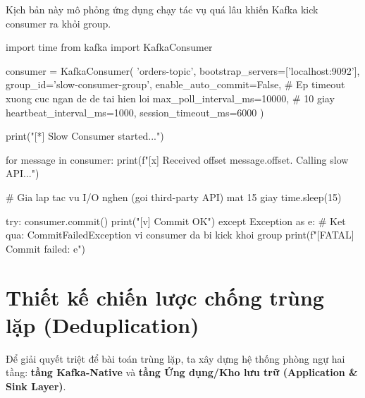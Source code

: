 \documentclass[12pt]{article}
\begin{document}
Kịch bản này mô phỏng ứng dụng chạy tác vụ quá lâu khiến Kafka kick consumer ra khỏi group.

\begin{aivnpybox}
import time
from kafka import KafkaConsumer

consumer = KafkaConsumer(
    'orders-topic',
    bootstrap_servers=['localhost:9092'],
    group_id='slow-consumer-group',
    enable_auto_commit=False,
    # Ep timeout xuong cuc ngan de de tai hien loi
    max_poll_interval_ms=10000,   # 10 giay
    heartbeat_interval_ms=1000,
    session_timeout_ms=6000
)

print("[*] Slow Consumer started...")

for message in consumer:
    print(f"[x] Received offset {message.offset}. Calling slow API...")

    # Gia lap tac vu I/O nghen (goi third-party API) mat 15 giay
    time.sleep(15)

    try:
        consumer.commit()
        print("[v] Commit OK")
    except Exception as e:
        # Ket qua: CommitFailedException vi consumer da bi kick khoi group
        print(f"[FATAL] Commit failed: {e}")
\end{aivnpybox}

\section{Thiết kế chiến lược chống trùng lặp (Deduplication)}

Để giải quyết triệt để bài toán trùng lặp, ta xây dựng hệ thống phòng ngự hai tầng: \textbf{tầng Kafka-Native} và \textbf{tầng Ứng dụng/Kho lưu trữ (Application \& Sink Layer)}.
\end{document}
